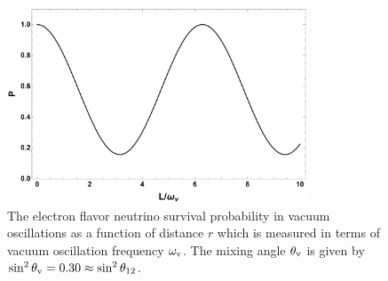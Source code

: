 \begin{figure}[htp]
    \centering
    \includegraphics[width=0.8\textwidth]{chapters/assets/basics/neutrino-vaccum-osc-2-flavor.pdf}
    \caption{The electron flavor neutrino survival probability in vacuum oscillations as a function of distance $r$ which is measured in terms of vacuum oscillation frequency $\omega_\mathrm v$. The mixing angle $\theta_\mathrm v$ is given by $\sin^2\theta_\mathrm v=0.30 \approx \sin^2 \theta_{12}$.}
    \label{chap:basics-section:neutrinos-fig:vacuum-2-flavor-osc}
\end{figure}



